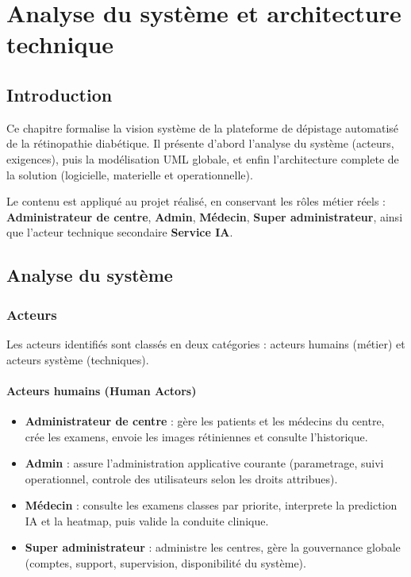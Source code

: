 
\chapter{Analyse du système et architecture technique}
\label{chap:analyse_architecture}

\section{Introduction}
Ce chapitre formalise la vision système de la plateforme de dépistage automatisé de la rétinopathie diabétique.
Il présente d'abord l'analyse du système (acteurs, exigences), puis la modélisation UML globale,
et enfin l'architecture complete de la solution (logicielle, materielle et operationnelle).

Le contenu est appliqué au projet réalisé, en conservant les rôles métier réels :
\textbf{Administrateur de centre}, \textbf{Admin}, \textbf{Médecin}, \textbf{Super administrateur}, ainsi que l'acteur technique secondaire \textbf{Service IA}.

\section{Analyse du système}

\subsection{Acteurs}
Les acteurs identifiés sont classés en deux catégories : acteurs humains (métier) et acteurs système (techniques).

\subsubsection*{Acteurs humains (Human Actors)}
\begin{itemize}
    \item \textbf{Administrateur de centre} : gère les patients et les médecins du centre, crée les examens,
    envoie les images rétiniennes et consulte l'historique.
    \item \textbf{Admin} : assure l'administration applicative courante (parametrage, suivi operationnel,
    controle des utilisateurs selon les droits attribues).
    \item \textbf{Médecin} : consulte les examens classes par priorite, interprete la prediction IA et la heatmap,
    puis valide la conduite clinique.
    \item \textbf{Super administrateur} : administre les centres, gère la gouvernance globale (comptes, support, supervision,
    disponibilité du système).
\end{itemize}

